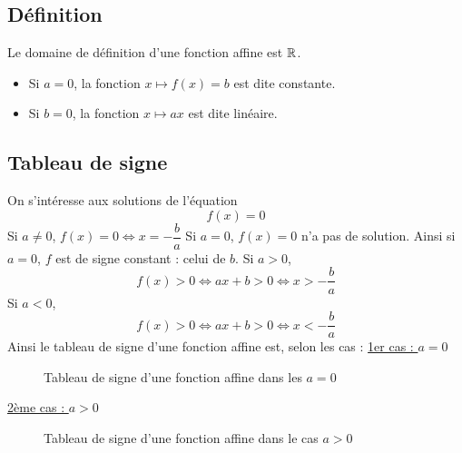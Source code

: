\subsection{Définition}
\newline
Le domaine de définition d'une fonction affine est $\mathbb{R}$. \newline
\begin{remarques}
\begin{itemize}
\item Si $a = 0$, la fonction $x\mapsto f(x) =b $ est dite constante.
\item Si $b = 0$, la fonction $x\mapsto ax$ est dite linéaire.
\end{itemize}
\end{remarques}


\subsection{Tableau de signe}
On s'intéresse aux solutions de l'équation $$f(x) = 0$$
Si $a \neq 0$, $f(x) = 0 \Leftrightarrow x = - \dfrac{b}{a}$\newline
Si $a = 0$, $f(x) = 0$ n'a pas de solution. \newline
Ainsi si $a=0$, $f$ est de signe constant : celui de $b$.\newline
Si $a > 0$, $$f(x) > 0 \Leftrightarrow ax+b> 0 \Leftrightarrow x > -\dfrac{b}{a}$$
Si $a < 0$, $$f(x) > 0 \Leftrightarrow ax+b> 0 \Leftrightarrow x < -\dfrac{b}{a}$$
Ainsi le tableau de signe d'une fonction affine est, selon les cas : \newline
\underline{1er cas : $a = 0$}\newline

\begin{figure}[H]
\centering
{}
\caption{Tableau de signe d'une fonction affine dans les $a=0$}
\end{figure}

\underline{2ème cas : $a > 0$}

\begin{figure}[H]
\centering
{}
\caption{Tableau de signe d'une fonction affine dans le cas $a>0$}
\end{figure}

